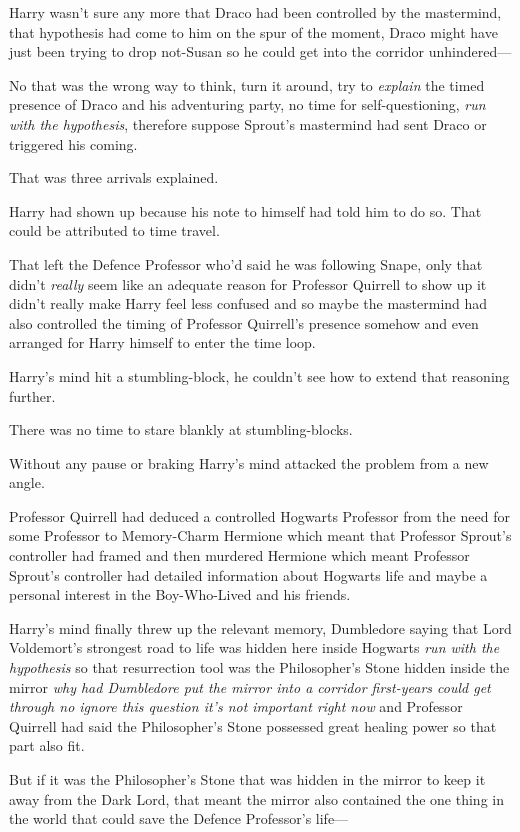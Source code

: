 Harry wasn’t sure any more that Draco had been controlled by the mastermind, that hypothesis had come to him on the spur of the moment, Draco might have just been trying to drop not-Susan so he could get into the corridor unhindered—

No that was the wrong way to think, turn it around, try to \emph{explain} the timed presence of Draco and his adventuring party, no time for self-questioning, \emph{run with the hypothesis}, therefore suppose Sprout’s mastermind had sent Draco or triggered his coming.

That was three arrivals explained.

Harry had shown up because his note to himself had told him to do so. That could be attributed to time travel.

That left the Defence Professor who’d said he was following Snape, only that didn’t \emph{really} seem like an adequate reason for Professor Quirrell to show up it didn’t really make Harry feel less confused and so maybe the mastermind had also controlled the timing of Professor Quirrell’s presence somehow and even arranged for Harry himself to enter the time loop.

Harry’s mind hit a stumbling-block, he couldn’t see how to extend that reasoning further.

There was no time to stare blankly at stumbling-blocks.

Without any pause or braking Harry’s mind attacked the problem from a new angle.

Professor Quirrell had deduced a controlled Hogwarts Professor from the need for some Professor to Memory-Charm Hermione which meant that Professor Sprout’s controller had framed and then murdered Hermione which meant Professor Sprout’s controller had detailed information about Hogwarts life and maybe a personal interest in the Boy-Who-Lived and his friends.

Harry’s mind finally threw up the relevant memory, Dumbledore saying that Lord Voldemort’s strongest road to life was hidden here inside Hogwarts \emph{run with the hypothesis} so that resurrection tool was the Philosopher’s Stone hidden inside the mirror \emph{why had Dumbledore put the mirror into a corridor first-years could get through no ignore this question it’s not important right now} and Professor Quirrell had said the Philosopher’s Stone possessed great healing power so that part also fit.

But if it was the Philosopher’s Stone that was hidden in the mirror to keep it away from the Dark Lord, that meant the mirror also contained the one thing in the world that could save the Defence Professor’s life—

